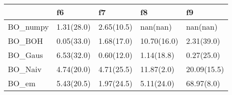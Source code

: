 \begin{tabular}{lllll}
\hline
          & f6         & f7         & f8          & f9          \\
\hline
 BO\_numpy & 1.31(28.0) & 2.65(10.5) & nan(nan)    & nan(nan)    \\
 BO\_BOH   & 0.05(33.0) & 1.68(17.0) & 10.70(16.0) & 2.31(39.0)  \\
 BO\_Gaus  & 6.53(32.0) & 0.60(12.0) & 1.14(18.8)  & 0.27(25.0)  \\
 BO\_Naiv  & 4.74(20.0) & 4.71(25.5) & 11.87(2.0)  & 20.09(15.5) \\
 BO\_em    & 5.43(20.5) & 1.97(24.5) & 5.11(24.0)  & 68.97(8.0)  \\
\hline
\end{tabular}